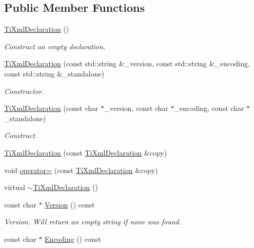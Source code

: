 \subsection*{Public Member Functions}
\begin{DoxyCompactItemize}
\item 
\hyperlink{class_ti_xml_declaration_aa0484d059bea0ea1acb47c9094382d79}{Ti\-Xml\-Declaration} ()
\begin{DoxyCompactList}\small\item\em Construct an empty declaration. \end{DoxyCompactList}\item 
\hyperlink{class_ti_xml_declaration_acd5556007c3c72209465081de39d9836}{Ti\-Xml\-Declaration} (const std\-::string \&\-\_\-version, const std\-::string \&\-\_\-encoding, const std\-::string \&\-\_\-standalone)
\begin{DoxyCompactList}\small\item\em Constructor. \end{DoxyCompactList}\item 
\hyperlink{class_ti_xml_declaration_a3b618d1c30c25e4b7a71f31a595ee298}{Ti\-Xml\-Declaration} (const char $\ast$\-\_\-version, const char $\ast$\-\_\-encoding, const char $\ast$\-\_\-standalone)
\begin{DoxyCompactList}\small\item\em Construct. \end{DoxyCompactList}\item 
\hyperlink{class_ti_xml_declaration_a58ac9042c342f7845c8491da0bb091e8}{Ti\-Xml\-Declaration} (const \hyperlink{class_ti_xml_declaration}{Ti\-Xml\-Declaration} \&copy)
\item 
void \hyperlink{class_ti_xml_declaration_a0fedc57539af9049be8db2d7d9d9ba33}{operator=} (const \hyperlink{class_ti_xml_declaration}{Ti\-Xml\-Declaration} \&copy)
\item 
virtual \hyperlink{class_ti_xml_declaration_ad5f37a673f4c507fd7e550470f9cec25}{$\sim$\-Ti\-Xml\-Declaration} ()
\item 
const char $\ast$ \hyperlink{class_ti_xml_declaration_a02ee557b1a4545c3219ed377c103ec76}{Version} () const 
\begin{DoxyCompactList}\small\item\em Version. Will return an empty string if none was found. \end{DoxyCompactList}\item 
const char $\ast$ \hyperlink{class_ti_xml_declaration_a5d974231f9e9a2f0542f15f3a46cdb76}{Encoding} () const 

\end{DoxyCompactItemize}
